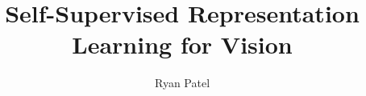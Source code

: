 \documentclass[12pt]{ut-thesis}
\author{Ryan Patel}
\title{Self-Supervised Representation Learning for Vision}
\begin{document}
\frontmatter
\maketitle

\begin{abstract}

\end{abstract}

\begin{acknowledgements}

\end{acknowledgements}

\tableofcontents
\listoftables
\listoffigures

\mainmatter






\appendix




\end{document}

